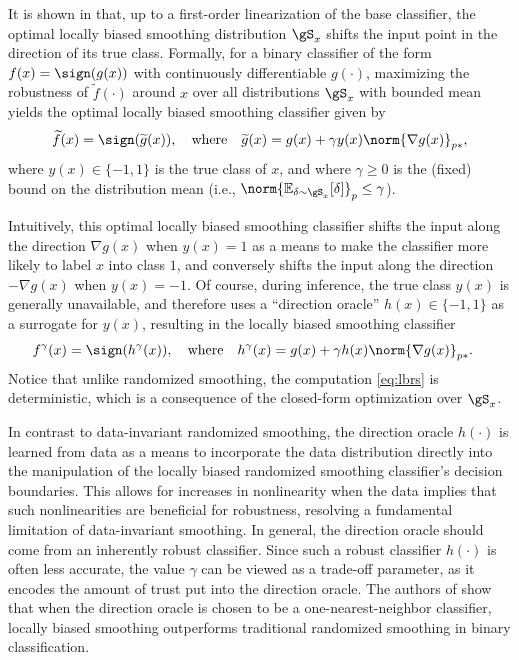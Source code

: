 \documentclass[11pt, letterpaper]{article}
\theoremstyle{plain}
\theoremstyle{definition}
\begin{document}
It is shown in \citep{Anderson21b} that, up to a first-order linearization of the base classifier, the optimal locally biased smoothing distribution $\gS_x$ shifts the input point in the direction of its true class. Formally, for a binary classifier of the form $f(x) = \sign(g(x))$ with continuously differentiable $g (\cdot)$, maximizing the robustness of $\widetilde{f}(\cdot)$ around $x$ over all distributions $\gS_x$ with bounded mean yields the optimal locally biased smoothing classifier given by
\begin{equation*}
	\widetilde{f}(x) = \sign(\widetilde{g}(x)), \quad \text{where} \quad \widetilde{g}(x) = g(x) + \gamma y(x) \norm{\nabla g(x)}_{p*},
\end{equation*}
where $y(x) \in \{-1,1\}$ is the true class of $x$, and where $\gamma \ge 0$ is the (fixed) bound on the distribution mean (i.e., $\norm{\mathbb{E}_{\delta \sim \gS_x} [ \delta ]}_p \le \gamma$).

Intuitively, this optimal locally biased smoothing classifier shifts the input along the direction $\nabla g(x)$ when $y(x) = 1$ as a means to make the classifier more likely to label $x$ into class $1$, and conversely shifts the input along the direction $-\nabla g(x)$ when $y(x)=-1$. Of course, during inference, the true class $y(x)$ is generally unavailable, and therefore \citep{Anderson21b} uses a ``direction oracle'' $h(x) \in \{-1,1\}$ as a surrogate for $y(x)$, resulting in the locally biased smoothing classifier
\begin{equation}
\begin{aligned}
	f^\gamma(x) &= \sign(h^\gamma(x)), \quad \text{where} \quad h^\gamma(x) = g(x) + \gamma h(x) \norm{\nabla g(x)}_{p*}.
\end{aligned}\label{eq:lbrs}
\end{equation}
Notice that unlike randomized smoothing, the computation \cref{eq:lbrs} is deterministic, which is a consequence of the closed-form optimization over $\gS_x$.

In contrast to data-invariant randomized smoothing, the direction oracle $h (\cdot)$ is learned from data as a means to incorporate the data distribution directly into the manipulation of the locally biased randomized smoothing classifier's decision boundaries. This allows for increases in nonlinearity when the data implies that such nonlinearities are beneficial for robustness, resolving a fundamental limitation of data-invariant smoothing. In general, the direction oracle should come from an inherently robust classifier. Since such a robust classifier $h (\cdot)$ is often less accurate, the value $\gamma$ can be viewed as a trade-off parameter, as it encodes the amount of trust put into the direction oracle. The authors of \citep{Anderson21b} show that when the direction oracle is chosen to be a one-nearest-neighbor classifier, locally biased smoothing outperforms traditional randomized smoothing in binary classification. 
\end{document}

